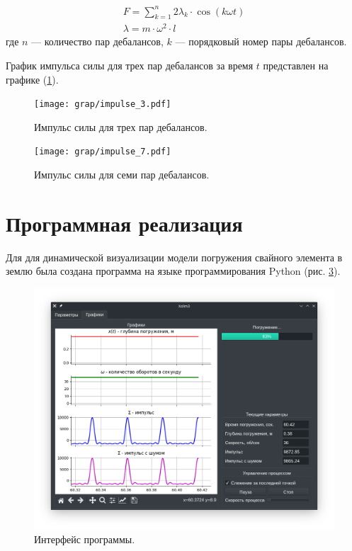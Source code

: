\begin{equation}\label{eq:short_harmonic_sum}
    \begin{gathered}
        F = \sum\limits_{k = 1}^n 2 \lambda_k \cdot \cos (k \omega t) \\
        \lambda = m \cdot \omega^2 \cdot l
    \end{gathered}
\end{equation}
\noindent где $n$ --- количество пар дебалансов, $k$ --- порядковый номер пары дебалансов.

График импульса силы для трех пар дебалансов за время $t$ представлен на графике (\ref{grap:impulse_3}).

\begin{figure}[h]
    \centering
    \texttt{[image: grap/impulse\_3.pdf]}
    \caption{Импульс силы для трех пар дебалансов.}
    \label{grap:impulse_3}
\end{figure}

\begin{figure}[h]
    \centering
    \texttt{[image: grap/impulse\_7.pdf]}
    \caption{Импульс силы для семи пар дебалансов.}
    \label{grap:impulse_7}
\end{figure}


\clearpage
\section{Программная реализация}
Для для динамической визуализации модели погружения свайного элемента в землю
была создана программа на языке программирования Python (рис. \ref{fig:xolm_3}).

\begin{figure}[h]
    \centering
    \includegraphics[width=1\linewidth]{img/xolm_3.png}
    \caption{Интерфейс программы.}
    \label{fig:xolm_3}
\end{figure}

